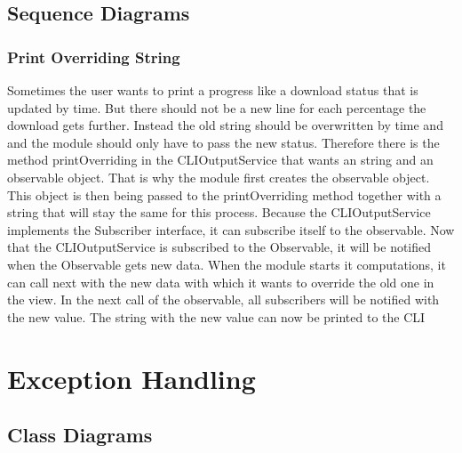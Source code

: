 \documentclass[parskip=full]{scrartcl}
\begin{document}
\newpage

\subsection{Sequence Diagrams}

\subsubsection{Print Overriding String}

\begin{figure}[h]
\begin{center}

\label{Print Overriding String}
\end{center}
\end{figure}
\newpage

Sometimes the user wants to print a progress like a download status that is updated by time.
But there should not be a new line for each percentage the download gets further.
Instead the old string should be overwritten by time and and the module should only have to pass the new status.
Therefore there is the method printOverriding in the CLIOutputService that wants an string and an observable object.
That is why the module first creates the observable object.
This object is then being passed to the printOverriding method together with a string that will stay the same for this process.
Because the CLIOutputService implements the Subscriber interface, it can subscribe itself to the observable.
Now that the CLIOutputService is subscribed to the Observable, it will be notified when the Observable gets new data.
When the module starts it computations, it can call next with the new data with which it wants to override the old one in the view.
In the next call of the observable, all subscribers will be notified with the new value.
The string with the new value can now be printed to the \gls{CLI}

\newpage

\section{Exception Handling}

\subsection{Class Diagrams}
\end{document}
